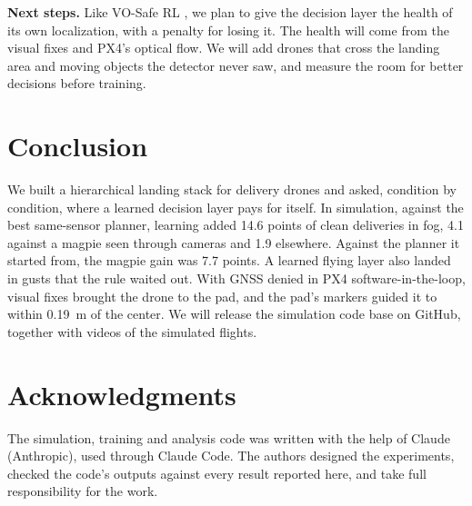 \textbf{Next steps.} Like VO-Safe RL \cite{lin2024vosafe}, we plan to give the decision layer the health of its own localization, with a penalty for losing it. The health will come from the visual fixes and PX4's optical flow. We will add drones that cross the landing area and moving objects the detector never saw, and measure the room for better decisions before training.

\section{Conclusion}

We built a hierarchical landing stack for delivery drones and asked, condition by condition, where a learned decision layer pays for itself. In simulation, against the best same-sensor planner, learning added 14.6 points of clean deliveries in fog, 4.1 against a magpie seen through cameras and 1.9 elsewhere. Against the planner it started from, the magpie gain was 7.7 points. A learned flying layer also landed in gusts that the rule waited out. With GNSS denied in PX4 software-in-the-loop, visual fixes brought the drone to the pad, and the pad's markers guided it to within 0.19~m of the center. We will release the simulation code base on GitHub, together with videos of the simulated flights.

\section*{Acknowledgments}

The simulation, training and analysis code was written with the help of Claude (Anthropic), used through Claude Code. The authors designed the experiments, checked the code's outputs against every result reported here, and take full responsibility for the work.
